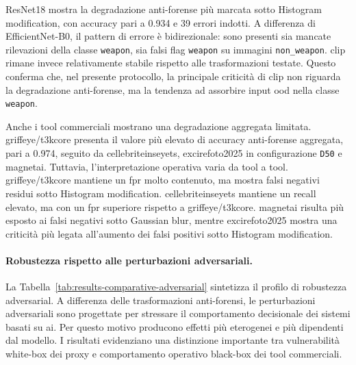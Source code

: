 ResNet18 mostra la degradazione anti-forense più marcata sotto Histogram
modification, con accuracy pari a 0.934 e 39 errori indotti. A differenza di
EfficientNet-B0, il pattern di errore è bidirezionale: sono presenti sia mancate
rilevazioni della classe \texttt{weapon}, sia falsi flag \texttt{weapon} su
immagini \texttt{non\_weapon}. \gls{clip} rimane invece relativamente stabile
rispetto alle trasformazioni testate. Questo conferma che, nel presente
protocollo, la principale criticità di \gls{clip} non riguarda la degradazione
anti-forense, ma la tendenza ad assorbire input \gls{ood} nella classe
\texttt{weapon}.

Anche i tool commerciali mostrano una degradazione aggregata limitata.
\gls{griffeye}/\gls{t3kcore} presenta il valore più elevato di accuracy anti-forense aggregata,
pari a 0.974, seguito da \gls{cellebriteinseyets},
\gls{excirefoto2025} in configurazione \texttt{D50} e \gls{magnetai}. Tuttavia,
l'interpretazione operativa varia da tool a tool. \gls{griffeye}/\gls{t3kcore}
mantiene un \gls{fpr} molto contenuto, ma mostra falsi negativi residui sotto
Histogram modification. \gls{cellebriteinseyets} mantiene un recall elevato, ma
con un \gls{fpr} superiore rispetto a \gls{griffeye}/\gls{t3kcore}. \gls{magnetai} risulta più
esposto ai falsi negativi sotto Gaussian blur, mentre \gls{excirefoto2025}
mostra una criticità più legata all'aumento dei falsi positivi sotto Histogram
modification.

\paragraph{Robustezza rispetto alle perturbazioni adversariali.}

La Tabella~\ref{tab:results-comparative-adversarial} sintetizza il profilo di
robustezza adversarial. A differenza delle trasformazioni anti-forensi, le
perturbazioni adversariali sono progettate per stressare il comportamento
decisionale dei sistemi basati su \gls{ai}. Per questo motivo producono effetti
più eterogenei e più dipendenti dal modello. I risultati evidenziano una
distinzione importante tra vulnerabilità white-box dei proxy e comportamento
operativo black-box dei tool commerciali.

